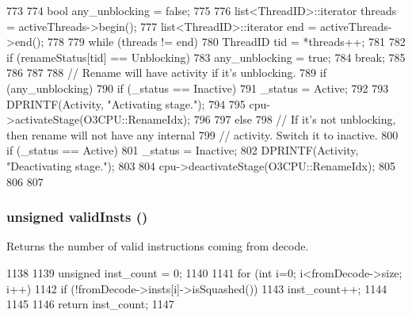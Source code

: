 \begin{DoxyCode}
773 {
774     bool any_unblocking = false;
775 
776     list<ThreadID>::iterator threads = activeThreads->begin();
777     list<ThreadID>::iterator end = activeThreads->end();
778 
779     while (threads != end) {
780         ThreadID tid = *threads++;
781 
782         if (renameStatus[tid] == Unblocking) {
783             any_unblocking = true;
784             break;
785         }
786     }
787 
788     // Rename will have activity if it's unblocking.
789     if (any_unblocking) {
790         if (_status == Inactive) {
791             _status = Active;
792 
793             DPRINTF(Activity, "Activating stage.\n");
794 
795             cpu->activateStage(O3CPU::RenameIdx);
796         }
797     } else {
798         // If it's not unblocking, then rename will not have any internal
799         // activity.  Switch it to inactive.
800         if (_status == Active) {
801             _status = Inactive;
802             DPRINTF(Activity, "Deactivating stage.\n");
803 
804             cpu->deactivateStage(O3CPU::RenameIdx);
805         }
806     }
807 }
\end{DoxyCode}
\hypertarget{classDefaultRename_ad533c56329b83d5b1aef92d0a6594b2c}{
\subsubsection[{validInsts}]{\setlength{\rightskip}{0pt plus 5cm}unsigned validInsts ()}}
\label{classDefaultRename_ad533c56329b83d5b1aef92d0a6594b2c}
Returns the number of valid instructions coming from decode. 


\begin{DoxyCode}
1138 {
1139     unsigned inst_count = 0;
1140 
1141     for (int i=0; i<fromDecode->size; i++) {
1142         if (!fromDecode->insts[i]->isSquashed())
1143             inst_count++;
1144     }
1145 
1146     return inst_count;
1147 }
\end{DoxyCode}


